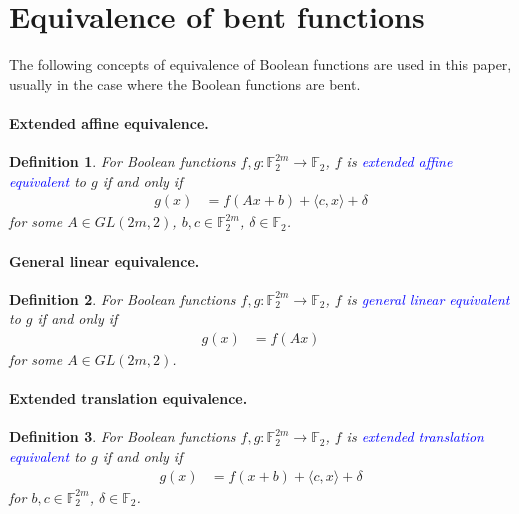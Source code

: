 \documentclass[12pt,a4paper]{article}
\newcommand{\mb}[1]{\mathbb{#1}}
\newcommand{\F}{\mb{F}}
\newcommand{\To}{\rightarrow}
\newcommand{\Emph}[1]{\emph{\textcolor{blue}{#1}}}
\newtheorem{Definition}{Definition}
\begin{document}
\section{Equivalence of bent functions}
\label{sec-Equivalence}
The following concepts of equivalence of Boolean functions are used in this paper,
usually in the case where the Boolean functions are bent.

\paragraph*{Extended affine equivalence.}

\begin{Definition}
For Boolean functions $f,g : \F_2^{2m} \To \F_2$,
$f$ is \Emph{extended affine equivalent} to $g$ \cite[Section 1.4]{Tok15bent} if and only if
\begin{align*}
g(x) &= f(A x + b) + \langle c, x \rangle + \delta
\end{align*}
for some $A \in GL(2m,2)$, $b, c \in \F_2^{2m}$, $\delta \in \F_2$.
\end{Definition}

\paragraph*{General linear equivalence.}

\begin{Definition}
For Boolean functions $f,g : \F_2^{2m} \To \F_2$,
$f$ is \Emph{general linear equivalent} to $g$ if and only if
\begin{align*}
g(x) &= f(A x)
\end{align*}
for some $A \in GL(2m,2)$.
\end{Definition}

\paragraph*{Extended translation equivalence.}

\begin{Definition}
For Boolean functions $f,g : \F_2^{2m} \To \F_2$,
$f$ is \Emph{extended translation equivalent} to $g$ if and only if
\begin{align*}
g(x) &= f(x + b) + \langle c, x \rangle + \delta
\end{align*}
for $b, c \in \F_2^{2m}$, $\delta \in \F_2$.
\end{Definition}
\end{document}

